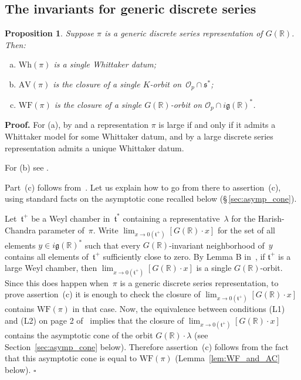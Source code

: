 \documentclass[10pt,leqno]{article}
\newtheorem{proposition}[equation]{Proposition}
\numberwithin{equation}{section}
\newcommand{\qed}{\hfill $\square$ \medskip}
\newenvironment{proof}[1][Proof]{\noindent\textbf{#1.} }{\qed}
\newcommand{\R}{\mathbb R}
\newcommand{\g}{\mathfrak g}
\newcommand{\s}{\mathfrak s}
\newcommand{\AV}{\mathrm{AV}}
\newcommand{\Wh}{\mathrm{Wh}}
\newcommand{\WF}{\mathrm{WF}}
\begin{document}
\subsection{The invariants for generic discrete series} 

\begin{proposition} \label{invariants_ds}
  Suppose $\pi$ is a generic discrete series representation of $G(\R)$. Then:
\begin{enumerate}[(a)]
\item $\Wh(\pi)$ is a single Whittaker datum;
\item $\AV(\pi)$ is the closure of a single $K$-orbit on~$\mathcal{O}_p \cap \s^*$;
\item  $\WF(\pi)$ is the closure of a single $G(\R)$-orbit on $\mathcal{O}_p \cap  i \g(\R)^*$.
\end{enumerate}
\end{proposition}

\begin{proof} For (a), by \cite{vogan-gelfand-kirillov} and \cite{kostant_whittaker}
a representation $\pi$ is large if and only if it admits a Whittaker model for some Whittaker datum,
and by \cite[Lemma 14.14]{abv} a  large discrete series representation admits a unique Whittaker datum.

For (b) see \cite[Proposition A.9]{AV1}.

Part~(c) follows from~\cite[Lemma B]{rossmann_limit_orbits}. Let us explain how to go from there to  assertion~(c), using standard facts on the asymptotic cone recalled below (\S\,{}\ref{sec:asymp_cone}).

Let~$\mathfrak{t}^+$ be a Weyl chamber in~$\mathfrak{t}^\ast$ containing a representative~$\lambda$ for the Harish-Chandra parameter of~$\pi$. Write $\lim_{x \to 0(\mathfrak{t}^+)}\left[ G(\R)\cdot x\right]$ for the set of all elements $y \in i\g(\R)^\ast$ such that every $G(\R)$-invariant neighborhood of~$y$ contains all elements of~$\mathfrak{t}^+$ sufficiently close to zero. By Lemma B in~\cite{rossmann_limit_orbits}, if $\mathfrak{t}^+$ is a large Weyl chamber, then $\lim_{x \to 0(\mathfrak{t}^+)} \left[G(\R)\cdot x\right]$ is a single $G(\R)$-orbit.  Since this does happen when~$\pi$ is a generic discrete series representation, to prove assertion~(c)  it is enough to check the closure of $\lim_{x \to 0(\mathfrak{t}^+)} \left[G(\R)\cdot x\right]$ contains $\WF(\pi)$ in that case. Now, the equivalence between conditions  (L1) and (L2) on page 2 of~\cite{rossmann_limit_orbits} implies that the closure of $\lim_{x \to 0(\mathfrak{t}^+)} \left[G(\R)\cdot x\right]$ contains the asymptotic cone of the orbit $G(\R)\cdot \lambda$  (see  Section~\ref{sec:asymp_cone} below). Therefore assertion~(c) follows from the fact that this asymptotic cone is equal to  $\WF(\pi)$  (Lemma~\ref{lem:WF_and_AC} below).
\end{proof}
\end{document}
